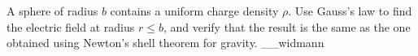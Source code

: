 A sphere of radius $b$ contains a uniform charge density $\rho$.
Use Gauss's law to find the electric field at radius $r\le b$, and
verify that the result is the same as the one obtained using Newton's
shell theorem for gravity.
__widmann
\answercheck


